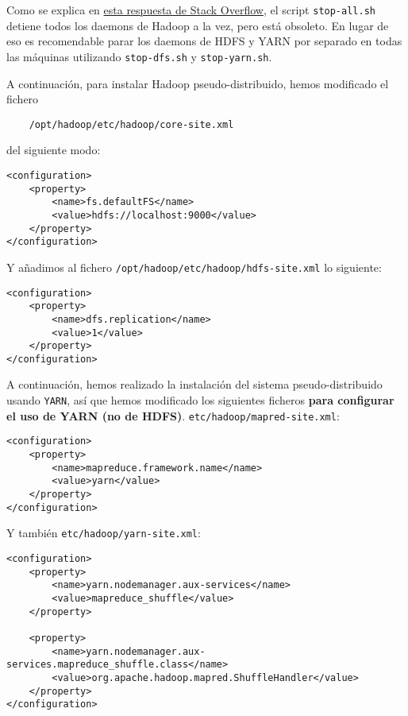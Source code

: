 \documentclass[11pt]{article}
\def\inline{\lstinline[basicstyle=\ttfamily,keywordstyle={}]}
\begin{document}
Como se explica en  \href{https://stackoverflow.com/questions/17569423/what-is-best-way-to-start-and-stop-hadoop-ecosystem-with-command-line}{esta respuesta de Stack Overflow}, el script \inline{stop-all.sh }detiene todos los daemons de Hadoop a la vez, pero está obsoleto. En lugar de eso es recomendable parar los daemons de HDFS y YARN por separado en todas las máquinas utilizando \inline|stop-dfs.sh| y  \inline{stop-yarn.sh}.

A continuación, para instalar Hadoop pseudo-distribuido, hemos modificado el fichero 
\begin{verbatim} 
    /opt/hadoop/etc/hadoop/core-site.xml
\end{verbatim}
del siguiente modo:


\begin{verbatim}
<configuration>
    <property>
        <name>fs.defaultFS</name>
        <value>hdfs://localhost:9000</value>
    </property>
</configuration>
\end{verbatim}


Y añadimos al fichero  \inline{/opt/hadoop/etc/hadoop/hdfs-site.xml} lo siguiente:
\begin{verbatim}
<configuration>
    <property>
        <name>dfs.replication</name>
        <value>1</value>
    </property>
</configuration>
\end{verbatim}

A continuación, hemos realizado la instalación del sistema pseudo-distribuido usando  \inline{YARN}, así que hemos modificado los siguientes ficheros \textbf{para configurar el uso de YARN (no de HDFS)}.  \inline{etc/hadoop/mapred-site.xml}:

\begin{verbatim}
<configuration>
    <property>
        <name>mapreduce.framework.name</name>
        <value>yarn</value>
    </property>
</configuration>
\end{verbatim}
Y también  \inline{etc/hadoop/yarn-site.xml}:

\begin{verbatim}
<configuration>
    <property>
        <name>yarn.nodemanager.aux-services</name>
        <value>mapreduce_shuffle</value>
    </property>
    
    <property>
        <name>yarn.nodemanager.aux-services.mapreduce_shuffle.class</name>
        <value>org.apache.hadoop.mapred.ShuffleHandler</value>
    </property>
</configuration>
\end{verbatim}
\end{document}
